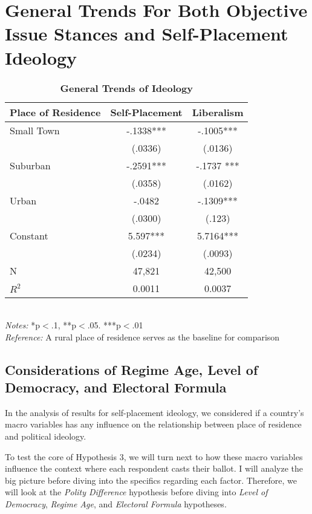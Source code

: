 \documentclass[12pt, titlepage]{article}
\newcommand\e{\emph}
\newcommand\tb{\textbf}
\begin{document}
\section{General Trends For Both Objective Issue Stances and Self-Placement Ideology}

\begin{singlespace}
	\begin{table}[H]
		\centering
		\def\arraystretch{1}
		\caption{\tb{General Trends of Ideology}}
		\begin{tabulary}{\linewidth}{l c c}
			\\
			\hline
			\tb{Place of Residence}&\tb{Self-Placement} & \tb{Liberalism} \\
			\hline
			Small Town&-.1338***& -.1005*** \\    
			& (.0336) & (.0136)  \\
			Suburban & -.2591*** &-.1737 ***\\ 
			& (.0358) &(.0162) \\
			Urban   & -.0482 &-.1309***  \\
			& (.0300)  &(.123)  \\
			Constant   & 5.597*** &5.7164*** \\
			&(.0234) & (.0093)\\
			N  & 47,821 & 42,500 \\
			$R^2$	& 0.0011 & 0.0037 \\
			\hline                                       
		\end{tabulary}
		\\
		\e{Notes:} *p$<$.1, **p$<$.05. ***p$<$.01 \\
		\e{Reference:} A rural place of residence serves as the baseline for comparison
		\label{table102}
	\end{table}
\end{singlespace}

\subsection{Considerations of Regime Age, Level of Democracy, and Electoral Formula}

In the analysis of results for self-placement ideology, we considered if a country's macro variables has any influence on the relationship between place of residence and political ideology.

To test the core of Hypothesis 3, we will turn next to how these macro variables influence the context where each respondent casts their ballot. I will analyze the big picture before diving into the specifics regarding each factor. Therefore, we will look at the \e{Polity Difference} hypothesis before diving into \e{Level of Democracy}, \e{Regime Age}, and \e{Electoral Formula} hypotheses.
\end{document}
